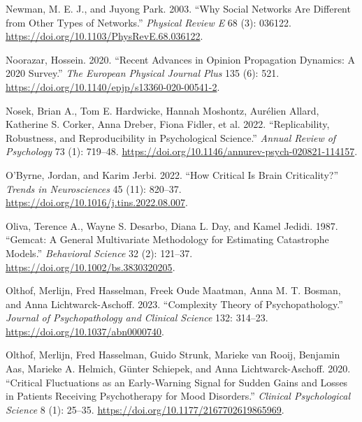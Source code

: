 \documentclass[
  letterpaper,
]{scrbook}
\newlength{\cslhangindent}
\newlength{\cslentryspacingunit} %
\newenvironment{CSLReferences}[2] %
 {%
  \setlength{\parindent}{0pt}
  \ifodd #1
  \let\oldpar\par
  \def\par{\hangindent=\cslhangindent\oldpar}
  \fi
  \setlength{\parskip}{#2\cslentryspacingunit}
 }%
 {}
\begin{document}
\begin{CSLReferences}{1}{0}
\leavevmode{}%
Newman, M. E. J., and Juyong Park. 2003. {``Why Social Networks Are
Different from Other Types of Networks.''} \emph{Physical Review E} 68
(3): 036122. \url{https://doi.org/10.1103/PhysRevE.68.036122}.

\leavevmode{}%
Noorazar, Hossein. 2020. {``Recent Advances in Opinion Propagation
Dynamics: A 2020 Survey.''} \emph{The European Physical Journal Plus}
135 (6): 521. \url{https://doi.org/10.1140/epjp/s13360-020-00541-2}.

\leavevmode{}%
Nosek, Brian A., Tom E. Hardwicke, Hannah Moshontz, Aurélien Allard,
Katherine S. Corker, Anna Dreber, Fiona Fidler, et al. 2022.
{``Replicability, {Robustness}, and {Reproducibility} in {Psychological
Science}.''} \emph{Annual Review of Psychology} 73 (1): 719--48.
\url{https://doi.org/10.1146/annurev-psych-020821-114157}.

\leavevmode{}%
O'Byrne, Jordan, and Karim Jerbi. 2022. {``How Critical Is Brain
Criticality?''} \emph{Trends in Neurosciences} 45 (11): 820--37.
\url{https://doi.org/10.1016/j.tins.2022.08.007}.

\leavevmode{}%
Oliva, Terence A., Wayne S. Desarbo, Diana L. Day, and Kamel Jedidi.
1987. {``Gemcat: {A} General Multivariate Methodology for Estimating
Catastrophe Models.''} \emph{Behavioral Science} 32 (2): 121--37.
\url{https://doi.org/10.1002/bs.3830320205}.

\leavevmode{}%
Olthof, Merlijn, Fred Hasselman, Freek Oude Maatman, Anna M. T. Bosman,
and Anna Lichtwarck-Aschoff. 2023. {``Complexity Theory of
Psychopathology.''} \emph{Journal of Psychopathology and Clinical
Science} 132: 314--23. \url{https://doi.org/10.1037/abn0000740}.

\leavevmode{}%
Olthof, Merlijn, Fred Hasselman, Guido Strunk, Marieke van Rooij,
Benjamin Aas, Marieke A. Helmich, Günter Schiepek, and Anna
Lichtwarck-Aschoff. 2020. {``Critical {Fluctuations} as an
{Early-Warning Signal} for {Sudden Gains} and {Losses} in {Patients
Receiving Psychotherapy} for {Mood Disorders}.''} \emph{Clinical
Psychological Science} 8 (1): 25--35.
\url{https://doi.org/10.1177/2167702619865969}.


\end{CSLReferences}
\end{document}
